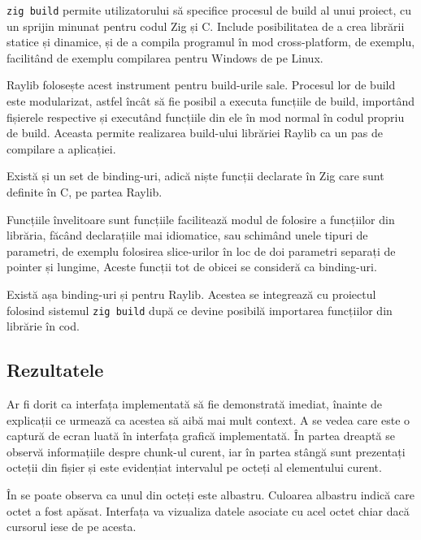 \documentclass[a4paper,12pt]{report}
\begin{document}
\texttt{zig build} permite utilizatorului să specifice procesul de build al unui proiect,
cu un sprijin minunat pentru codul Zig și C.
Include posibilitatea de a crea librării statice și dinamice, și de a compila programul în mod cross-platform,
de exemplu, facilitând de exemplu compilarea pentru Windows de pe Linux.

Raylib folosește acest instrument pentru build-urile sale.
Procesul lor de build este modularizat, astfel încât să fie posibil a executa funcțiile de build,
importând fișierele respective și executând funcțiile din ele în mod normal în codul propriu de build.
Aceasta permite realizarea build-ului librăriei Raylib ca un pas de compilare a aplicației.

Există și un set de binding-uri, adică niște funcții declarate în Zig care sunt definite în C, pe partea Raylib.

Funcțiile învelitoare sunt funcțiile facilitează modul de folosire a funcțiilor din librăria,
făcând declarațiile mai idiomatice, sau schimând unele tipuri de parametri,
de exemplu folosirea slice-urilor în loc de doi parametri separați de pointer și lungime,
Aceste funcții tot de obicei se consideră ca binding-uri.

Există așa binding-uri și pentru Raylib\cite{raylib_zig}.
Acestea se integrează cu proiectul folosind sistemul \texttt{zig build}
după ce devine posibilă importarea funcțiilor din librărie în cod.

\subsection{Rezultatele}

Ar fi dorit ca interfața implementată să fie demonstrată imediat,
înainte de explicații ce urmează ca acestea să aibă mai mult context.
A se vedea  care este o captură de ecran luată în interfața grafică implementată.
În partea dreaptă se observă informațiile despre chunk-ul curent,
iar în partea stângă sunt prezentați octeții din fișier
și este evidențiat intervalul pe octeți al elementului curent.


În  se poate observa ca unul din octeți este albastru.
Culoarea albastru indică care octet a fost apăsat.
Interfața va vizualiza datele asociate cu acel octet chiar dacă cursorul iese de pe acesta.

\end{document}
